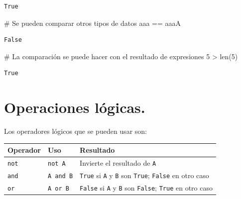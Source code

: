 \documentclass[
  spanish,
  letterpaper,
]{scrbook}
\newenvironment{Shaded}{\begin{snugshade}}{\end{snugshade}}
\newcommand{\BuiltInTok}[1]{\textcolor[rgb]{0.00,0.23,0.31}{#1}}
\newcommand{\CommentTok}[1]{\textcolor[rgb]{0.37,0.37,0.37}{#1}}
\newcommand{\DecValTok}[1]{\textcolor[rgb]{0.68,0.00,0.00}{#1}}
\newcommand{\NormalTok}[1]{\textcolor[rgb]{0.00,0.23,0.31}{#1}}
\newcommand{\OperatorTok}[1]{\textcolor[rgb]{0.37,0.37,0.37}{#1}}
\newcommand{\StringTok}[1]{\textcolor[rgb]{0.13,0.47,0.30}{#1}}
\theoremstyle{definition}
\theoremstyle{remark}
\begin{document}
\begin{verbatim}
True
\end{verbatim}

\begin{Shaded}
\begin{Highlighting}[]
\CommentTok{\# Se pueden comparar otros tipos de datos}
\CommentTok{\textquotesingle{}aaa\textquotesingle{}} \OperatorTok{==} \StringTok{\textquotesingle{}aaaA\textquotesingle{}} 
\end{Highlighting}
\end{Shaded}

\begin{verbatim}
False
\end{verbatim}

\begin{Shaded}
\begin{Highlighting}[]
\CommentTok{\# La comparación se puede hacer con el resultado de expresiones}
\DecValTok{5} \OperatorTok{\textgreater{}} \BuiltInTok{len}\NormalTok{(}\StringTok{\textquotesingle{}5\textquotesingle{}}\NormalTok{)}
\end{Highlighting}
\end{Shaded}

\begin{verbatim}
True
\end{verbatim}

\section{Operaciones lógicas.}\label{operaciones-luxf3gicas.}

Los operadores lógicos que se pueden usar son:

\begin{longtable}[]{@{}
  >{\raggedright\arraybackslash}p{}
  >{\raggedright\arraybackslash}p{}
  >{\raggedright\arraybackslash}p{}@{}}
\toprule\noalign{}
\begin{minipage}[b]{\linewidth}\raggedright
Operador
\end{minipage} & \begin{minipage}[b]{\linewidth}\raggedright
Uso
\end{minipage} & \begin{minipage}[b]{\linewidth}\raggedright
Resultado
\end{minipage} \\
\midrule\noalign{}
\endhead
\bottomrule\noalign{}
\endlastfoot
\texttt{not} & \texttt{not\ A} & Invierte el resultado de \texttt{A} \\
\texttt{and} & \texttt{A\ and\ B} & \texttt{True} si \texttt{A} y
\texttt{B} son \texttt{True}; \texttt{False} en otro caso \\
\texttt{or} & \texttt{A\ or\ B} & \texttt{False} si \texttt{A} y
\texttt{B} son \texttt{False}; \texttt{True} en otro caso \\
\end{longtable}
\end{document}
